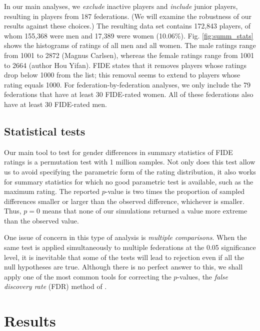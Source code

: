 \documentclass[9pt,twocolumn,twoside,lineno]{pnas-new}
\begin{document}
In our main analyses, we {\it exclude} inactive players and {\it include} junior players, resulting in players from 187 federations. (We will examine the robustness of our results against these choices.) The resulting data set contains 172,843 players, of whom 155,368 were men and 17,389 were women (10.06\%). Fig. \ref{fig:summ_stats} shows the histograms of ratings of all men and all women. The male ratings range from 1001 to 2872 (Magnus Carlsen), whereas the female ratings range from 1001 to 2664 (author Hou Yifan). FIDE states that it removes players whose ratings drop below 1000 from the list; this removal seems to extend to players whose rating equals 1000.  For federation-by-federation analyses, we only include the 79  federations that have at least 30 FIDE-rated women. All of these federations also have at least 30 FIDE-rated men. 





\subsection*{Statistical tests} 
Our main tool to test for gender differences in summary statistics of FIDE ratings is a permutation test with 1 million samples. Not only does this test allow us to avoid specifying the parametric form of the rating distribution, it also works for summary statistics for which no good parametric test is available, such as the maximum rating. The reported $p$-value is two times the proportion of sampled differences smaller or larger than the observed difference, whichever is smaller. Thus, $p=0$ means that none of our simulations returned a value more extreme than the observed value.

One issue of concern in this type of analysis is \textit{multiple comparisons}. When the same test is applied simultaneously to multiple federations at the 0.05 significance level, it is inevitable that some of the tests will lead to rejection even if all the null hypotheses are true. Although there is no perfect answer to this, we shall apply one of the most common tools for correcting the $p$-values, the \textit{false discovery rate} (FDR) method of \cite{BH95}.

\section*{Results}
\end{document}
